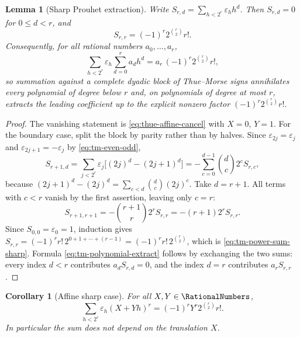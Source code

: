 \documentclass[11pt,oneside]{article}
\newtheorem{lemma}[theorem]{Lemma}
\newtheorem{corollary}[theorem]{Corollary}
\theoremstyle{definition}
\theoremstyle{remark}
\begin{document}
\begin{lemma}[Sharp Prouhet extraction]
\label{thm:tm-prouhet-extract}
Write $S_{r,d}=\sum_{h<2^r}\varepsilon_h h^d$.  Then $S_{r,d}=0$ for $0\le d<r$, and
\begin{equation}
 S_{r,r}=(-1)^r2^{\binom r2}r!.                            \label{eq:tm-power-sum-sharp}
\end{equation}
Consequently, for all rational numbers $a_0,\ldots,a_r$,
\begin{equation}
 \sum_{h<2^r}\varepsilon_h\sum_{d=0}^{r}a_dh^d
 =a_r\,(-1)^r2^{\binom r2}r!,                              \label{eq:tm-polynomial-extract}
\end{equation}
so summation against a complete dyadic block of Thue--Morse signs annihilates every
polynomial of degree below $r$ and, on polynomials of degree at most $r$, extracts the
leading coefficient up to the explicit nonzero factor $(-1)^r2^{\binom r2}r!$.
\end{lemma}

\begin{proof}
The vanishing statement is \eqref{eq:thue-affine-cancel} with $X=0$, $Y=1$.  For the
boundary case, split the block by parity rather than by halves.  Since
$\varepsilon_{2j}=\varepsilon_j$ and $\varepsilon_{2j+1}=-\varepsilon_j$ by
\eqref{eq:tm-even-odd},
\begin{equation*}
 S_{r+1,d}
 =\sum_{j<2^r}\varepsilon_j\bigl[(2j)^d-(2j+1)^d\bigr]
 =-\sum_{c=0}^{d-1}\binom dc2^{c}S_{r,c},
\end{equation*}
because $(2j+1)^d-(2j)^d=\sum_{c<d}\binom dc(2j)^c$.  Take $d=r+1$.  All terms with $c<r$
vanish by the first assertion, leaving only $c=r$:
\begin{equation*}
 S_{r+1,r+1}=-\binom{r+1}{r}2^rS_{r,r}=-(r+1)2^rS_{r,r}.
\end{equation*}
Since $S_{0,0}=\varepsilon_0=1$, induction gives
$S_{r,r}=(-1)^rr!\,2^{0+1+\cdots+(r-1)}=(-1)^rr!\,2^{\binom r2}$, which is
\eqref{eq:tm-power-sum-sharp}.  Formula \eqref{eq:tm-polynomial-extract} follows by
exchanging the two sums: every index $d<r$ contributes $a_dS_{r,d}=0$, and the index $d=r$
contributes $a_rS_{r,r}$.
\end{proof}

\begin{corollary}[Affine sharp case]
\label{thm:tm-affine-sharp}
For all $X,Y\in\RationalNumbers$,
\begin{equation*}
 \sum_{h<2^r}\varepsilon_h(X+Yh)^r=(-1)^rY^r2^{\binom r2}r!.
\end{equation*}
In particular the sum does not depend on the translation $X$.
\end{corollary}
\end{document}
